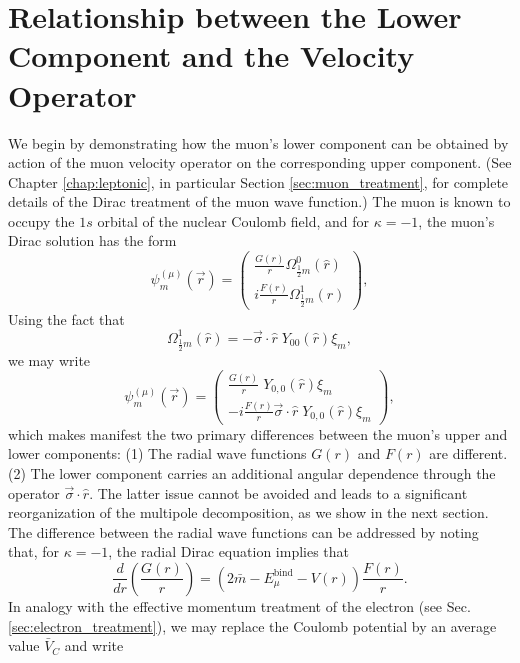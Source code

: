 \documentclass{book}[letterpaper,12pt]
\begin{document}
\section{Relationship between the Lower Component and the Velocity Operator}
We begin by demonstrating how the muon's lower component can be obtained by action of the muon velocity operator on the corresponding upper component. (See Chapter \ref{chap:leptonic}, in particular Section \ref{sec:muon_treatment}, for complete details of the Dirac treatment of the muon wave function.) The muon is known to occupy the $1s$ orbital of the nuclear Coulomb field, and for $\kappa=-1$, the muon's Dirac solution has the form
\begin{equation}
\psi^{(\mu)}_m(\vec{r})=\left(\begin{array}{c}
\frac{G(r)}{r}\Omega^0_{\frac{1}{2}m}(\hat{r})\\
i\frac{F(r)}{r}\Omega^1_{\frac{1}{2}m}(\hat{r})
\end{array}\right),
\end{equation}
Using the fact that 
\begin{equation}
\Omega^1_{\frac{1}{2}m}(\hat{r})=-\vec{\sigma}\cdot\hat{r}\;Y_{00}(\hat{r})\xi_m,
\end{equation}
we may write
\begin{equation}
\psi^{(\mu)}_m(\vec{r})=\left(\begin{array}{c}
\frac{G(r)}{r}\;Y_{0,0}(
\hat{r})\xi_m\\
-i\frac{F(r)}{r}\vec{\sigma}\cdot\hat{r}\;Y_{0,0}(\hat{r})\xi_m
\end{array}\right),
\end{equation}
which makes manifest the two primary differences between the muon's upper and lower components: (1) The radial wave functions $G(r)$ and $F(r)$ are different. (2) The lower component carries an additional angular dependence through the operator $\vec{\sigma}\cdot \hat{r}$. The latter issue cannot be avoided and leads to a significant reorganization of the multipole decomposition, as we show in the next section. The difference between the radial wave functions can be addressed by noting that, for $\kappa=-1$, the radial Dirac equation implies that
\begin{equation}
\frac{d}{dr}\left(\frac{G(r)}{r}\right)=\left(2\bar{m}-E^\mathrm{bind}_{\mu}-V(r)\right)\frac{F(r)}{r}.
\end{equation}
In analogy with the effective momentum treatment of the electron (see Sec. \ref{sec:electron_treatment}), we may replace the Coulomb potential by an average value $\bar{V}_C$ and write
\end{document}
